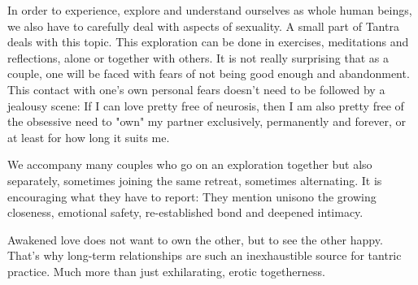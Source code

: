 In order to experience, explore and understand ourselves as whole human beings, we also have to carefully deal with aspects of sexuality. A small part of Tantra deals with this topic. This exploration can be done in exercises, meditations and reflections, alone or together with others. It is not really surprising that as a couple, one will be faced with fears of not being good enough and abandonment. This contact with one's own personal fears doesn't need to be followed by a jealousy scene: If I can love pretty free of neurosis, then I am also pretty free of the obsessive need to "own" my partner  exclusively, permanently and forever, or at least for how long it suits me.

We accompany many couples who go on an exploration together but also separately, sometimes joining the same retreat, sometimes alternating. It is encouraging what they have to report: They mention unisono the growing closeness, emotional safety, re-established bond and deepened intimacy.

Awakened love does not want to own the other, but to see the other happy. That's why long-term relationships are such an inexhaustible source for tantric practice. Much more than just exhilarating, erotic togetherness.
